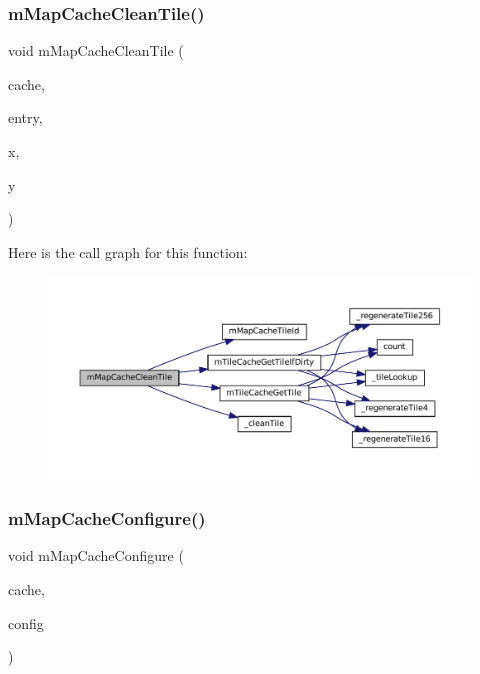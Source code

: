 \subsubsection{\texorpdfstring{m\+Map\+Cache\+Clean\+Tile()}{mMapCacheCleanTile()}}
{\footnotesize\ttfamily void m\+Map\+Cache\+Clean\+Tile (\begin{DoxyParamCaption}\item[{struct m\+Map\+Cache $\ast$}]{cache,  }\item[{struct m\+Map\+Cache\+Entry $\ast$}]{entry,  }\item[{unsigned}]{x,  }\item[{unsigned}]{y }\end{DoxyParamCaption})}

Here is the call graph for this function\+:
\nopagebreak
\begin{figure}[H]
\begin{center}
\leavevmode
\includegraphics[width=350pt]{map-cache_8c_abccd8ab5a0dafd34ed2be822edc14af6_cgraph}
\end{center}
\end{figure}
\mbox{\label{map-cache_8c_a5d5ff55807cf89a961eaae6c599191ea}} 
\subsubsection{\texorpdfstring{m\+Map\+Cache\+Configure()}{mMapCacheConfigure()}}
{\footnotesize\ttfamily void m\+Map\+Cache\+Configure (\begin{DoxyParamCaption}\item[{struct m\+Map\+Cache $\ast$}]{cache,  }\item[{m\+Map\+Cache\+Configuration}]{config }\end{DoxyParamCaption})}

